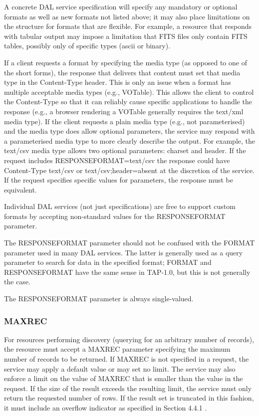 \documentclass[11pt,letter]{ivoa}
\begin{document}
A concrete DAL service specification will specify any mandatory or optional
formats as well as new formats not listed above; it may also place limitations
on the structure for formats that are flexible.  For example, a resource that
responds with tabular output may impose a limitation that FITS files only
contain FITS tables, possibly only of specific types (ascii or binary).

If a client requests a format by specifying the media type (as opposed to one of
the short forms), the response that delivers that content must set that
media type
in the Content-Type header. This is only an issue when a format has multiple
acceptable media types (e.g., VOTable). This allows the client to control the
Content-Type so that it can reliably cause specific applications to handle the
response (e.g., a browser rendering a VOTable generally requires the text/xml
media type). If the client requests a plain media type (e.g., not parameterised) and
the media type does allow optional parameters, the service may respond with a
parameterised media type to more clearly describe the output. For example, the
text/csv media type allows two optional parameters: charset and header. If the
request includes RESPONSEFORMAT=text/csv the response could have Content-Type
text/csv or text/csv;header=absent at the discretion of the service. If the
request specifies specific values for parameters, the response must be
equivalent.

Individual DAL services (not just specifications) are free to support custom
formats by accepting non-standard values for the RESPONSEFORMAT parameter.

The RESPONSEFORMAT parameter should not be confused with the FORMAT parameter
used in many DAL services. The latter is generally used as a query parameter to
search for data in the specified format; FORMAT and RESPONSEFORMAT have the same
sense in TAP-1.0, but this is not generally the case.

The RESPONSEFORMAT parameter is always single-valued.

\subsubsection{MAXREC}
\label{sec:MAXREC}
For resources performing discovery (querying for an arbitrary number of
records), the resource must accept a MAXREC parameter specifying the maximum
number of records to be returned. If MAXREC is not specified in a request, the
service may apply a default value or may set no limit. The service may also
enforce a limit on the value of MAXREC that is smaller than the value in the
request. If the size of the result exceeds the resulting limit, the service must
only return the requested number of rows. If the result set is truncated in this
fashion, it must include an overflow indicator as specified in Section 4.4.1 .
\end{document}
